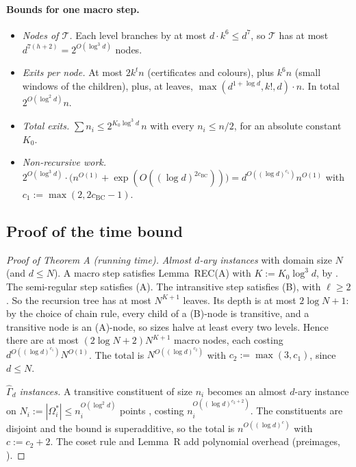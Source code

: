 \documentclass[11pt]{article}
\theoremstyle{plain}
\theoremstyle{definition}
\theoremstyle{remark}
\theoremstyle{named}
\theoremstyle{namedrm}
\newcommand{\Gd}{\widehat{\Gamma}_d}
\newcommand{\cT}{\mathcal{T}}
\begin{document}
\paragraph{Bounds for one macro step.}
\begin{itemize}
\item \emph{Nodes of $\cT$.} Each level branches by at most $d\cdot k^6\le d^7$, so $\cT$ has at most
  $d^{7(h+2)}=2^{O(\log^3d)}$ nodes.
\item \emph{Exits per node.} At most $2k^tn$ (certificates and colours), plus $k^6n$ (small windows of the
  children), plus, at leaves, $\max(d^{1+\log d},k!,d)\cdot n$. In total $2^{O(\log^2d)}n$.
\item \emph{Total exits.} $\sum n_i\le2^{K_0\log^3d}\,n$ with every $n_i\le n/2$, for an absolute constant $K_0$.
\item \emph{Non-recursive work.} $2^{O(\log^3d)}\cdot\big(n^{O(1)}+\exp(O((\log d)^{2c_{\mathrm{BC}}}))\big)
  =d^{O((\log d)^{c_1})}n^{O(1)}$ with $c_1:=\max(2,2c_{\mathrm{BC}}-1)$.
\end{itemize}

\subsection{Proof of the time bound}\label{sec:timebound}

\begin{proof}[Proof of Theorem A (running time)]
\emph{Almost $d$-ary instances} with domain size $N$ (and $d\le N$). A macro step satisfies
Lemma~REC(A) with $K:=K_0\log^3d$, by \cite[Lemma~2.6]{GNS}. The semi-regular step satisfies (A).
The intransitive step satisfies (B), with $\ell\ge2$. So the recursion tree has at most $N^{K+1}$ leaves. Its
depth is at most $2\log N+1$: by the choice of chain rule, every child of a (B)-node is transitive, and a
transitive node is an (A)-node, so sizes halve at least every two levels. Hence there are at most
$(2\log N+2)N^{K+1}$ macro nodes, each costing $d^{O((\log d)^{c_1})}N^{O(1)}$. The total is
$N^{O((\log d)^{c_2})}$ with $c_2:=\max(3,c_1)$, since $d\le N$.

\emph{$\Gd$ instances.} A transitive constituent of size $n_i$ becomes an almost $d$-ary instance on
$N_i:=|\Omega_i^*|\le n_i^{O(\log^2d)}$ points \cite[Thm.~4.6]{GNS}, costing $n_i^{O((\log d)^{c_2+2})}$. The
constituents are disjoint and the bound is superadditive, so the total is $n^{O((\log d)^c)}$ with
$c:=c_2+2$. The coset rule and Lemma~R add polynomial overhead (preimages, \cite[Thm.~2.1]{GNS}).
\end{proof}
\end{document}
